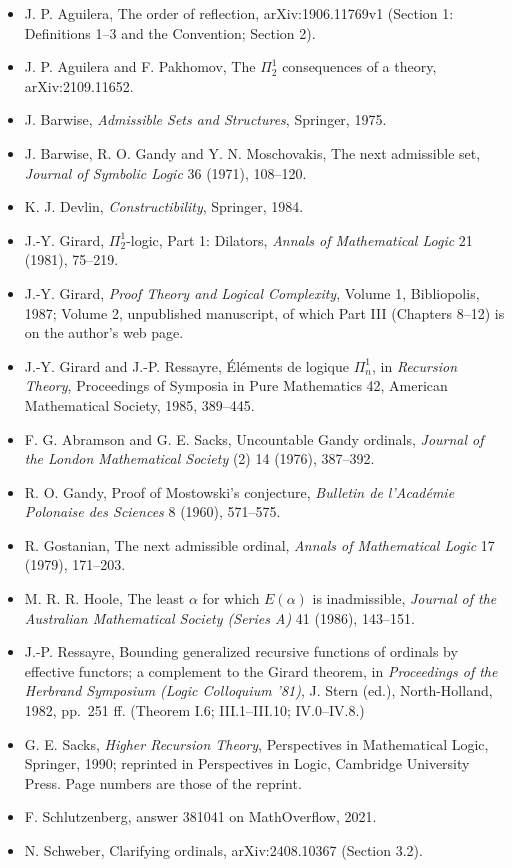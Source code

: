 \documentclass[11pt]{article}
\begin{document}
\begin{itemize}
\item J. P. Aguilera, The order of reflection, arXiv:1906.11769v1 (Section 1: Definitions 1--3 and the
  Convention; Section 2).
\item J. P. Aguilera and F. Pakhomov, The $\Pi^1_2$ consequences of a theory, arXiv:2109.11652.
\item J. Barwise, \emph{Admissible Sets and Structures}, Springer, 1975.
\item J. Barwise, R. O. Gandy and Y. N. Moschovakis, The next admissible set, \emph{Journal of Symbolic Logic} 36 (1971), 108--120.
\item K. J. Devlin, \emph{Constructibility}, Springer, 1984.
\item J.-Y. Girard, $\Pi^1_2$-logic, Part 1: Dilators, \emph{Annals of Mathematical Logic} 21 (1981), 75--219.
\item J.-Y. Girard, \emph{Proof Theory and Logical Complexity}, Volume 1, Bibliopolis, 1987; Volume 2, unpublished
  manuscript, of which Part III (Chapters 8--12) is on the author's web page.
\item J.-Y. Girard and J.-P. Ressayre, \'El\'ements de logique $\Pi^1_n$, in \emph{Recursion Theory}, Proceedings
  of Symposia in Pure Mathematics 42, American Mathematical Society, 1985, 389--445.
\item F. G. Abramson and G. E. Sacks, Uncountable Gandy ordinals, \emph{Journal of the London Mathematical Society} (2) 14 (1976), 387--392.
\item R. O. Gandy, Proof of Mostowski's conjecture, \emph{Bulletin de l'Acad\'emie Polonaise des Sciences} 8 (1960), 571--575.
\item R. Gostanian, The next admissible ordinal, \emph{Annals of Mathematical Logic} 17 (1979), 171--203.
\item M. R. R. Hoole, The least $\alpha$ for which $E(\alpha)$ is inadmissible, \emph{Journal of the Australian
  Mathematical Society (Series A)} 41 (1986), 143--151.
\item J.-P. Ressayre, Bounding generalized recursive functions of ordinals by effective functors; a complement to
  the Girard theorem, in \emph{Proceedings of the Herbrand Symposium (Logic Colloquium '81)}, J. Stern (ed.),
  North-Holland, 1982, pp.\ 251 ff. (Theorem I.6; III.1--III.10; IV.0--IV.8.)
\item G. E. Sacks, \emph{Higher Recursion Theory}, Perspectives in Mathematical Logic, Springer, 1990; reprinted in Perspectives in Logic, Cambridge University Press. Page numbers are those of the reprint.
\item F. Schlutzenberg, answer 381041 on MathOverflow, 2021.
\item N. Schweber, Clarifying ordinals, arXiv:2408.10367 (Section 3.2).
\end{itemize}
\end{document}
